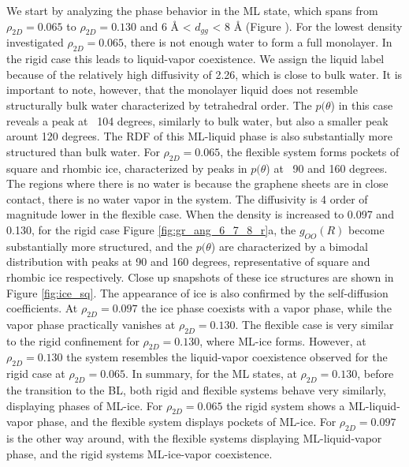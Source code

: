 \documentclass[journal=acsnano,manuscript=article]{achemso}
\begin{document}
We start by analyzing the phase behavior in the ML state, which spans from \(\rho_{2D}=0.065\) to \(\rho_{2D}=0.130\) and 6 \r A < \(d_{gg}\) < 8 \r A (Figure \label{fig:struct_6_7_8}). For the lowest density investigated \(\rho_{2D}=0.065\), there is not enough water to form a full monolayer. In the rigid case this leads to liquid-vapor coexistence. We assign the liquid label because of the relatively high diffusivity of 2.26, which is close to bulk water. It is important to note, however, that the monolayer liquid does not resemble structurally bulk water characterized by tetrahedral order. The \(p(\theta\)) in this case reveals a peak at ~104 degrees, similarly to bulk water, but also a smaller peak arount 120 degrees. The RDF of this ML-liquid phase is also substantially more structured than bulk water. For \(\rho_{2D}=0.065\), the flexible system forms pockets of square and rhombic ice, characterized by peaks in \(p(\theta\)) at ~90 and 160 degrees. The regions where there is no water is because the graphene sheets are in close contact, there is no water vapor in the system. The diffusivity is 4 order of magnitude lower in the flexible case. When the density is increased to 0.097 and 0.130, for the rigid case Figure \ref{fig:gr_ang_6_7_8_r}a, the \(g_{OO}(R)\) become substantially more structured, and the \(p(\theta\)) are characterized by a bimodal distribution with peaks at 90 and 160 degrees, representative of square and rhombic ice respectively. Close up snapshots of these ice structures are shown in Figure \ref{fig:ice_sq}. The appearance of ice is also confirmed by the self-diffusion coefficients. At \(\rho_{2D}=0.097\) the ice phase coexists with a vapor phase, while the vapor phase practically vanishes at \(\rho_{2D}=0.130\). The flexible case is very similar to the rigid confinement for \(\rho_{2D}=0.130\), where ML-ice forms. However, at \(\rho_{2D}=0.130\) the system resembles the liquid-vapor coexistence observed for the rigid case at \(\rho_{2D}=0.065\). In summary, for the ML states, at \(\rho_{2D}=0.130\), before the transition to the BL, both rigid and flexible systems behave very similarly, displaying phases of ML-ice. For \(\rho_{2D}=0.065\) the rigid system shows a ML-liquid-vapor phase, and the flexible system displays pockets of ML-ice. For \(\rho_{2D}=0.097\) is the other way around, with the flexible systems displaying ML-liquid-vapor phase, and the rigid systems ML-ice-vapor coexistence. 
	
\end{document}
